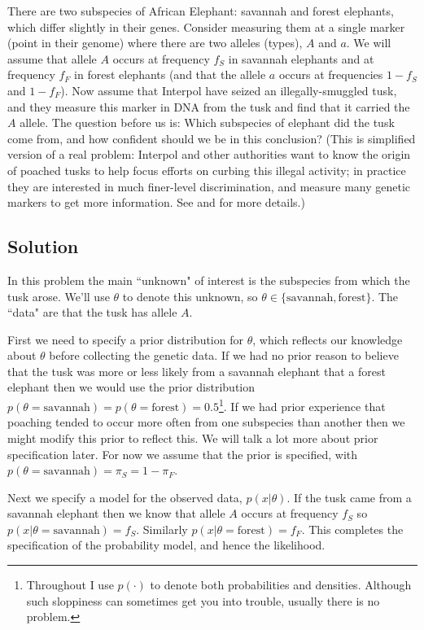 \documentclass[times,11pt]{article}
\def\s{\mbox{savannah}}
\def\f{\mbox{forest}}
\def\ffA{f_F}
\def\fsA{f_S}
\def\pif{\pi_F}
\def\pis{\pi_S}
\begin{document}
There are two subspecies of African Elephant: savannah and forest elephants, which differ slightly in their genes. Consider measuring them at a single marker (point in their genome) where there are two alleles (types), $A$ and $a$. We will assume that allele $A$ occurs at frequency $\fsA$ in savannah elephants 
and at frequency $\ffA$ in forest elephants (and that the allele $a$ occurs at frequencies $1-\fsA$ and $1-\ffA$). Now assume that Interpol have seized an illegally-smuggled tusk, and they measure this marker in DNA from the tusk and find that it carried the $A$ allele. The question before us is: Which subspecies of elephant did the tusk come from, and how confident should we be in this conclusion? (This is simplified version of a real problem: Interpol and other authorities want to know the origin of poached tusks to help focus efforts on curbing this illegal activity; in practice they are interested in much finer-level discrimination, and measure many genetic markers to get more information. See
\cite{wasser.etal.07} and \cite{wasser.etal.08}
for more details.)


\subsection*{Solution}

In this problem the main ``unknown" of interest is the subspecies from which the tusk arose. We'll use $\theta$ to denote this unknown, so $\theta \in \{\s,\f\}$. The ``data" are that the tusk has allele $A$.

First we need to specify a prior distribution for $\theta$, which reflects our knowledge about $\theta$ before collecting the genetic data. If we had no prior reason to believe that the tusk was more or less likely from a savannah elephant that a forest elephant then we would use the prior distribution $p(\theta=\s) = p(\theta=\f) = 0.5$\footnote{Throughout I use $p(\cdot)$ to denote both probabilities and densities. Although such sloppiness can sometimes get you into trouble, usually there is no problem.}. If we had prior experience that poaching tended to occur more often from one subspecies than another then we might modify this prior to reflect this. We will talk a lot more about prior specification later. For now we assume that the prior is specified, with $p(\theta=\s)= \pis = 1-\pif$.

Next we specify a model for the observed data, $p(x | \theta)$.
If the tusk came from a savannah elephant then we know that allele $A$ occurs at frequency $\fsA$ so $p( x | \theta=\s) = \fsA$. Similarly $p(x | \theta=\f) = \ffA$. This completes the specification of the probability model, and hence the likelihood.
\end{document}
